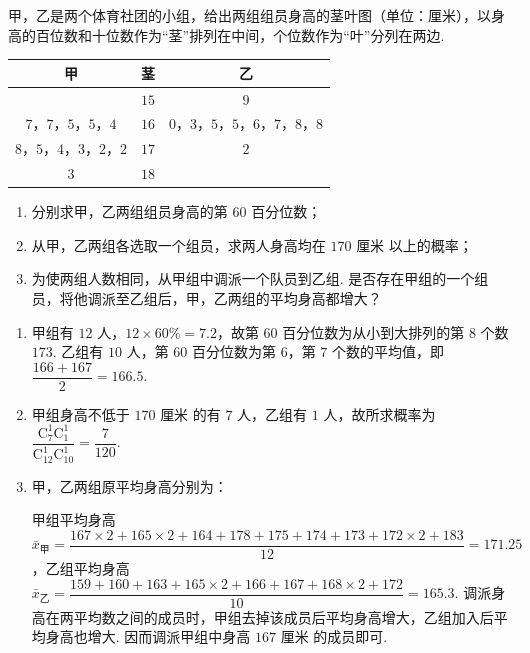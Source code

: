 \documentclass[UTF8,a4paper,oneside,11pt]{ctexbook}
\begin{document}
\begin{problem}
甲，乙是两个体育社团的小组，给出两组组员身高的茎叶图（单位：厘米），以身高的百位数和十位数作为“茎”排列在中间，个位数作为“叶”分列在两边.

\begin{center}
\begin{tabular}{c|c|c}
甲 & 茎 & 乙\\
\hline
 & \(15\) & \(9\)\\
\(7\)，\(7\)，\(5\)，\(5\)，\(4\) & \(16\) & \(0\)，\(3\)，\(5\)，\(5\)，\(6\)，\(7\)，\(8\)，\(8\)\\
\(8\)，\(5\)，\(4\)，\(3\)，\(2\)，\(2\) & \(17\) & \(2\)\\
\(3\) & \(18\) &
\end{tabular}
\end{center}

\begin{enumerate}
\item 分别求甲，乙两组组员身高的第 \(60\) 百分位数；
\item 从甲，乙两组各选取一个组员，求两人身高均在 \(170\text{ 厘米}\) 以上的概率；
\item 为使两组人数相同，从甲组中调派一个队员到乙组. 是否存在甲组的一个组员，将他调派至乙组后，甲，乙两组的平均身高都增大？
\end{enumerate}
\end{problem}

\begin{solution}
\begin{enumerate}
\item 甲组有 \(12\) 人，\(12\times60\%=7.2\)，故第 \(60\) 百分位数为从小到大排列的第 \(8\) 个数 \(173\). 乙组有 \(10\) 人，第 \(60\) 百分位数为第 \(6\)，第 \(7\) 个数的平均值，即 \(\dfrac{166+167}{2}=166.5\).
\item 甲组身高不低于 \(170\text{ 厘米}\) 的有 \(7\) 人，乙组有 \(1\) 人，故所求概率为 \(\dfrac{\mathrm C_7^1\mathrm C_1^1}{\mathrm C_{12}^1\mathrm C_{10}^1}=\dfrac7{120}\).
\item 甲，乙两组原平均身高分别为：

甲组平均身高 \(\bar x_{\text{甲}}=\dfrac{167\times2+165\times2+164+178+175+174+173+172\times2+183}{12}=171.25\)，乙组平均身高 \(\bar x_{\text{乙}}=\dfrac{159+160+163+165\times2+166+167+168\times2+172}{10}=165.3\). 调派身高在两平均数之间的成员时，甲组去掉该成员后平均身高增大，乙组加入后平均身高也增大. 因而调派甲组中身高 \(167\text{ 厘米}\) 的成员即可.
\end{enumerate}
\end{solution}
\end{document}
